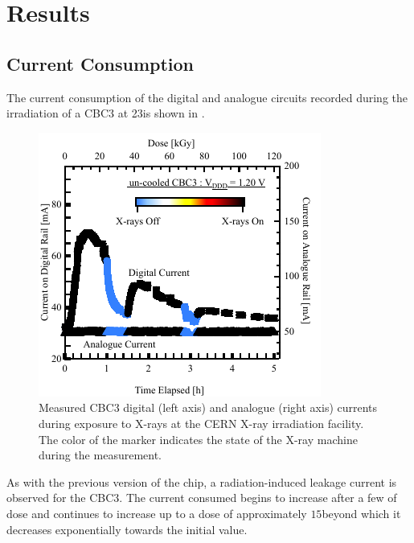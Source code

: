 \section{Results}
\label{sec:Results}
\subsection{Current Consumption}
\label{subsec:DigiCurrent}
The current consumption of the digital and analogue circuits recorded during the irradiation of a CBC3 at 23\kGyH is shown in . 

\begin{figure}[!htbp]
\centering
\includegraphics[width=0.8\linewidth]{Figures/DigiCurrent_CBC3_Uncooled.pdf}
\vspace*{-2mm}
\caption{Measured CBC3 digital (left axis) and analogue (right axis) currents during 
exposure to X-rays at the CERN X-ray irradiation facility. The color of the marker indicates the state of the X-ray machine during the measurement. 
}
\label{fig:DigiCurrent}
\end{figure}
As with the previous version of the chip, a radiation-induced leakage current is observed for the CBC3.
The current consumed begins to increase after a few \kGy of dose and continues to increase up to a dose of approximately $15$\kGy beyond which it decreases exponentially towards the initial value.

